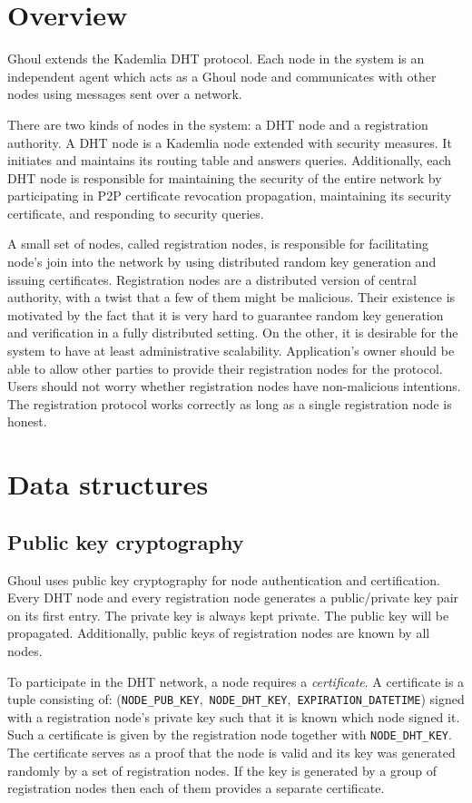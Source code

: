 \section{Overview}
\label{sec:ghoul_overview}
Ghoul extends the Kademlia DHT protocol.
Each node in the system is an independent agent which acts as a Ghoul node and
communicates with other nodes using messages sent over a network.

There are two kinds of nodes in the system: a DHT node and a registration
authority. A DHT node is a Kademlia node extended with security measures.
It initiates and maintains its routing table and answers queries. Additionally,
each DHT node is responsible for maintaining the security of the entire network
by participating in P2P certificate revocation propagation, maintaining its
security certificate, and responding to security queries.

A small set of nodes, called registration nodes, is responsible for facilitating
node’s join into the network by using distributed random key generation and
issuing certificates.
Registration nodes are a distributed version of central
authority, with a twist that a few of them might be malicious. Their existence
is motivated by the fact that it is very hard to guarantee random key generation
and verification in a fully distributed setting. On the other, it is desirable
for the system to have at least administrative scalability. Application's owner
should be able to allow other parties to provide their registration nodes for
the protocol. Users should not worry whether registration nodes have
non-malicious intentions. The registration protocol works correctly as long as a
single registration node is honest.

\section{Data structures}
\label{sec:ghoul_data}

\subsection{Public key cryptography}
Ghoul uses public key cryptography for node authentication and certification.
Every DHT node and every registration node generates a public/private key pair
on its first entry. The private key is always kept private. The public key will
be propagated. Additionally, public keys of registration nodes are known by all
nodes.

To participate in the DHT network, a node requires a \emph{certificate}.
A certificate is a tuple consisting of:
(\texttt{NODE\_PUB\_KEY},~\texttt{NODE\_DHT\_KEY},~\texttt{EXPIRATION\_DATETIME})
signed with a registration node's private key such that it is known which node
signed it. Such a certificate is given by the registration node together with
\texttt{NODE\_DHT\_KEY}. The certificate serves as a proof that the node is
valid and its key was generated randomly by a set of registration nodes. If the
key is generated by a group of registration nodes then each of them provides a
separate certificate.

